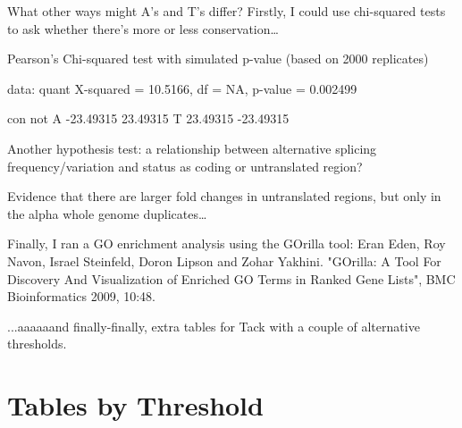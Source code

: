 \documentclass{article}
\begin{document}
What other ways might A's and T's differ? Firstly, I could use chi-squared tests to ask whether there's more or less conservation\ldots

\begin{Schunk}
\begin{Soutput}
	Pearson's Chi-squared test with simulated p-value (based on 2000
	replicates)

data:  quant
X-squared = 10.5166, df = NA, p-value = 0.002499
\end{Soutput}
\begin{Soutput}
        con       not
A -23.49315  23.49315
T  23.49315 -23.49315
\end{Soutput}
\end{Schunk}

Another hypothesis test: a relationship between alternative splicing frequency/variation and status as coding or untranslated region?


Evidence that there are larger fold changes in untranslated regions, but only in the alpha whole genome duplicates\ldots

Finally, I ran a GO enrichment analysis using the GOrilla tool: Eran Eden, Roy Navon, Israel Steinfeld, Doron Lipson and Zohar Yakhini. "GOrilla: A Tool For Discovery And Visualization of Enriched GO Terms in Ranked Gene Lists", BMC Bioinformatics 2009, 10:48.
  



...aaaaaand finally-finally, extra tables for Tack with a couple of alternative thresholds.

\section*{Tables by Threshold}
\end{document}
